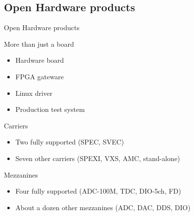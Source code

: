 \documentclass[compress,red]{beamer}
\begin{document}
\subsection{Open Hardware products}

\begin{frame}{Open Hardware products}

  \begin{block}{More than just a board}
    \begin{itemize}
    \item Hardware board
    \item FPGA gateware
    \item Linux driver
    \item Production test system
    \end{itemize}
  \end{block}

  \begin{block}{Carriers}
    \begin{itemize}
    \item Two fully supported (SPEC, SVEC)
    \item Seven other carriers (SPEXI, VXS, AMC, stand-alone)
    \end{itemize}
  \end{block}


  \begin{block}{Mezzanines}
    \begin{itemize}
    \item Four fully supported (ADC-100M, TDC, DIO-5ch, FD)
    \item About a dozen other mezzanines (ADC, DAC, DDS, DIO)
    \end{itemize}
  \end{block}



\end{frame}
\end{document}
